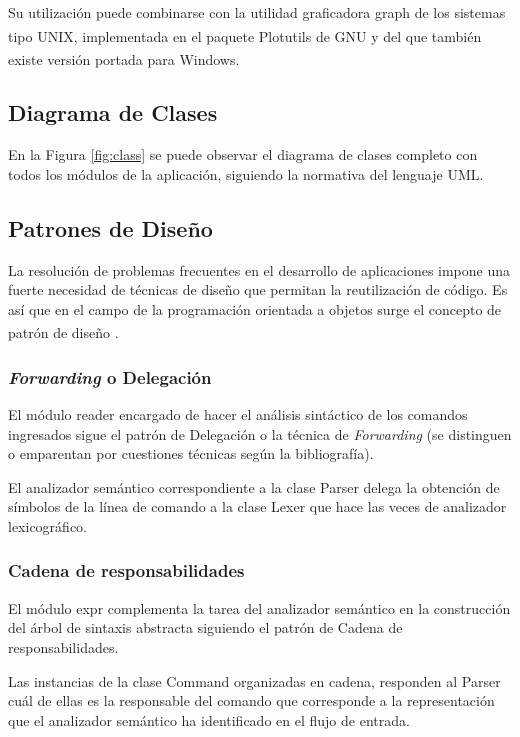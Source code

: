 \documentclass[a4paper]{article}
\let\originalcite\cite
\renewcommand{\cite}[2][]{\textsuperscript{\originalcite{#2}}}
\begin{document}
Su utilización puede combinarse con la utilidad graficadora
{\ttfamily graph} de los sistemas tipo UNIX, implementada
en el paquete Plotutils de GNU\cite{bib:plot} y del que también existe 
versión portada para Windows\cite{bib:win}.

\subsection{Diagrama de Clases}

En la Figura \ref{fig:class} se puede observar el diagrama de
clases completo con todos los módulos de la aplicación, siguiendo
la normativa del lenguaje UML. 

\subsection{Patrones de Diseño}

La resolución de problemas frecuentes en el desarrollo de 
aplicaciones impone una fuerte necesidad de técnicas de diseño
que permitan la reutilización de código. Es así que en el
campo de la programación orientada a objetos surge el 
concepto de patrón de diseño \cite{bib:gof}.

\subsubsection{\textit{Forwarding} o Delegación}

El módulo {\ttfamily reader} encargado de hacer el análisis
sintáctico de los comandos ingresados sigue el patrón de 
Delegación o la técnica de \textit{Forwarding} (se distinguen
o emparentan por cuestiones técnicas según la bibliografía).

El analizador semántico correspondiente a la clase 
{\ttfamily Parser} delega la obtención de símbolos de la línea
de comando a la clase {\ttfamily Lexer} que hace las veces
de analizador lexicográfico.

\subsubsection{Cadena de responsabilidades}

El módulo {\ttfamily expr} complementa la tarea del analizador
semántico en la construcción del árbol de sintaxis abstracta
siguiendo el patrón de Cadena de responsabilidades.

Las instancias de la clase {\ttfamily Command} organizadas en
cadena, responden al {\ttfamily Parser} cuál de ellas es la 
responsable del comando que corresponde a la representación
que el analizador semántico ha identificado en el flujo de 
entrada.
\end{document}
